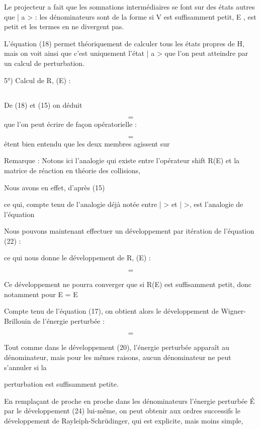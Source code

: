 Le projecteur a fait que les somnations intermédiaires se font sur
des états autres que | a > : les dénominateurs sont de la forme  si
V est suffisamment petit, E , est petit et les termes en ne
divergent pas.

L'équation (18) permet théoriquement de calculer tous les états propres de H, mais on voit ainsi que c'est uniquement l'état | a > que l'on peut
atteindre par un calcul de perturbation.

5°) Calcul de R, (E) :

\subsection{}%
De (18) et (15) on déduit

\[
\tag{21}=
\]
que l'on peut écrire de façon opératorielle :

\[
\tag{22}=
\]
étent bien entendu que les deux membres agissent sur 


Remarque : Notons ici l'analogie qui existe entre l'opérateur shift R(E) et la
matrice de réaction en théorie des collisions,

Nous avons en effet, d'après (15)

ce qui, compte tenu de l'analogie déjà notée entre |  > et  |  >,
est l'analogie de l'équation

Nous pouvons maintenant effectuer un développement par itération de l'équation (22) :

ce qui nous donne le développement de R, (E) :

\[
\tag{23}=
\]

Ce développement ne pourra converger que si R(E) est suffisamment petit, donc
notamment pour E = E

Compte tenu de l'équation (17), on obtient alors le développement de
Wigner-Brillouin de l'énergie perturbée :

\[
\tag{24}=
\]

Tout comme dans le développement (20), l'énergie perturbée apparaît au dénominateur, mais pour les mêmes raisons, aucun dénominateur ne peut s'annuler si la

perturbation est suffisamment petite.

En remplaçant de proche en proche dans les dénominateurs l'énergie
perturbée É par le développement (24) lui-même, on peut obtenir aux ordres
successifs le développement de Rayleiph-Schrüdinger, qui est explicite, mais
moins simple,

